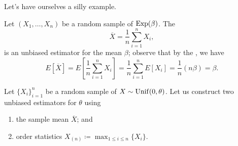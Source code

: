 \documentclass[notoc,notitlepage]{tufte-book}
\begin{document}
Let's have ourselves a silly example.

\begin{eg}
  Let $(X_1, \ldots, X_n)$ be a random sample of $\operatorname{Exp}(\beta)$. The
  \begin{equation*}
    \overline{X} = \frac{1}{n} \sum_{i=1}^{n} X_i,
  \end{equation*}
  is an unbiased estimator for the mean $\beta$; observe that by the
  , we have
  \begin{equation*}
    E[\overline{X}] = E \left[ \frac{1}{n} \sum_{i=1}^{n} X_i \right] =
    \frac{1}{n} \sum_{i=1}^{n} E[X_i] = \frac{1}{n} (n\beta) = \beta.
  \end{equation*}
\end{eg}

\begin{eg}
  Let $\{ X_i \}_{i=1}^{n}$ be a random sample of $X \sim \operatorname{Unif}(0, \theta)$. Let
  us construct two unbiased estimators for $\theta$ using
  \begin{enumerate}
    \item the sample mean $\overline{X}$; and
    \item order statistics $X_{(n)} \coloneqq \max_{1 \leq i \leq n} \{ X_i \}$.
  \end{enumerate}
\end{eg}
\end{document}
